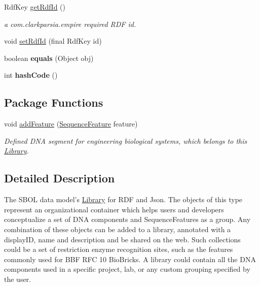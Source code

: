 \begin{DoxyCompactItemize}
RdfKey \hyperlink{classorg_1_1sbolstandard_1_1lib_s_b_o_lj_1_1_library_a98d34c30847c78a8922be878a2fa4d49}{getRdfId} ()
\begin{DoxyCompactList}\small\item\em a com.clarkparsia.empire required RDF id. \item\end{DoxyCompactList}\item 
void \hyperlink{classorg_1_1sbolstandard_1_1lib_s_b_o_lj_1_1_library_afe8d2a1ced8871ba217ddf364366da99}{setRdfId} (final RdfKey id)
\item 
\hypertarget{classorg_1_1sbolstandard_1_1lib_s_b_o_lj_1_1_library_ae3ce8ca5a04e8966a9d2158aeeecfc16}{
boolean {\bfseries equals} (Object obj)}
\label{classorg_1_1sbolstandard_1_1lib_s_b_o_lj_1_1_library_ae3ce8ca5a04e8966a9d2158aeeecfc16}

\item 
\hypertarget{classorg_1_1sbolstandard_1_1lib_s_b_o_lj_1_1_library_a077e18fe97323c7194e2665ffc766399}{
int {\bfseries hashCode} ()}
\label{classorg_1_1sbolstandard_1_1lib_s_b_o_lj_1_1_library_a077e18fe97323c7194e2665ffc766399}

\end{DoxyCompactItemize}
\subsection*{Package Functions}
\begin{DoxyCompactItemize}
\item 
void \hyperlink{classorg_1_1sbolstandard_1_1lib_s_b_o_lj_1_1_library_a8606f263fb4a3f3d9d7265cf1d1095d3}{addFeature} (\hyperlink{classorg_1_1sbolstandard_1_1lib_s_b_o_lj_1_1_sequence_feature}{SequenceFeature} feature)
\begin{DoxyCompactList}\small\item\em Defined DNA segment for engineering biological systems, which belongs to this \hyperlink{classorg_1_1sbolstandard_1_1lib_s_b_o_lj_1_1_library}{Library}. \item\end{DoxyCompactList}\end{DoxyCompactItemize}


\subsection{Detailed Description}
The SBOL data model's \hyperlink{classorg_1_1sbolstandard_1_1lib_s_b_o_lj_1_1_library}{Library} for RDF and Json. The objects of this type represent an organizational container which helps users and developers conceptualize a set of DNA components and SequenceFeatures as a group. Any combination of these objects can be added to a library, annotated with a displayID, name and description and be shared on the web. Such collections could be a set of restriction enzyme recognition sites, such as the features commonly used for BBF RFC 10 BioBricks. A library could contain all the DNA components used in a specific project, lab, or any custom grouping specified by the user.

